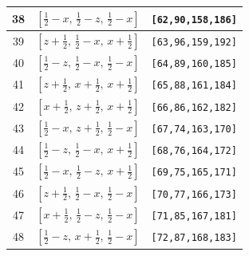 \documentclass[fleqn,8pt]{jsarticle}
\begin{document}
\begin{longtable}{ccc}
38 & $\left[ \frac{1}{2} - x,\, \frac{1}{2} - z,\, \frac{1}{2} - x \right]$ & {\tt [62,90,158,186]} \\ \hline
39 & $\left[ z + \frac{1}{2},\, \frac{1}{2} - x,\, x + \frac{1}{2} \right]$ & {\tt [63,96,159,192]} \\ \hline
40 & $\left[ \frac{1}{2} - z,\, \frac{1}{2} - x,\, \frac{1}{2} - x \right]$ & {\tt [64,89,160,185]} \\ \hline
41 & $\left[ z + \frac{1}{2},\, x + \frac{1}{2},\, x + \frac{1}{2} \right]$ & {\tt [65,88,161,184]} \\ \hline
42 & $\left[ x + \frac{1}{2},\, z + \frac{1}{2},\, x + \frac{1}{2} \right]$ & {\tt [66,86,162,182]} \\ \hline
43 & $\left[ \frac{1}{2} - x,\, z + \frac{1}{2},\, \frac{1}{2} - x \right]$ & {\tt [67,74,163,170]} \\ \hline
44 & $\left[ \frac{1}{2} - z,\, \frac{1}{2} - x,\, x + \frac{1}{2} \right]$ & {\tt [68,76,164,172]} \\ \hline
45 & $\left[ \frac{1}{2} - x,\, \frac{1}{2} - z,\, x + \frac{1}{2} \right]$ & {\tt [69,75,165,171]} \\ \hline
46 & $\left[ z + \frac{1}{2},\, \frac{1}{2} - x,\, \frac{1}{2} - x \right]$ & {\tt [70,77,166,173]} \\ \hline
47 & $\left[ x + \frac{1}{2},\, \frac{1}{2} - z,\, \frac{1}{2} - x \right]$ & {\tt [71,85,167,181]} \\ \hline
48 & $\left[ \frac{1}{2} - z,\, x + \frac{1}{2},\, \frac{1}{2} - x \right]$ & {\tt [72,87,168,183]} \\
\end{longtable}
\renewcommand{\arraystretch}{1.2}
\end{document}
